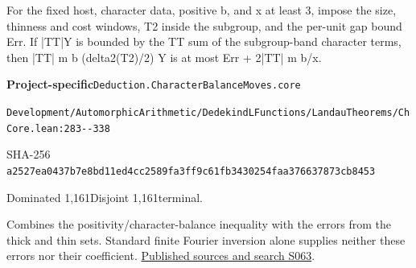 
\begin{formalstatement}[D561]\label{decomp:D561}
For the fixed host, character data, positive b, and x at least 3, impose the size, thinness and cost windows, T2 inside the subgroup, and the per-unit gap bound Err. If |TT|Y is bounded by the TT sum of the subgroup-band character terms, then |TT| m b (delta2(T2)/2) Y is at most Err + 2|TT| m b/x.
\end{formalstatement}
{\small\raggedright\noindent\textsf{\bfseries Project-specific}\quad \nolinkurl{Deduction.CharacterBalanceMoves.core}\par\noindent \nolinkurl{Development/AutomorphicArithmetic/DedekindLFunctions/LandauTheorems/ChCore.lean:283--338}\par\noindent SHA-256 \nolinkurl{a2527ea0437b7e8bd11ed4cc2589fa3ff9c61fb3430254faa376637873cb8453}\par\noindent Dominated 1,161\quad Disjoint 1,161\quad terminal.\par}
Combines the positivity/character-balance inequality with the errors from the thick and thin sets. Standard finite Fourier inversion alone supplies neither these errors nor their coefficient.
\hyperref[lit:S063]{Published sources and search S063}.
